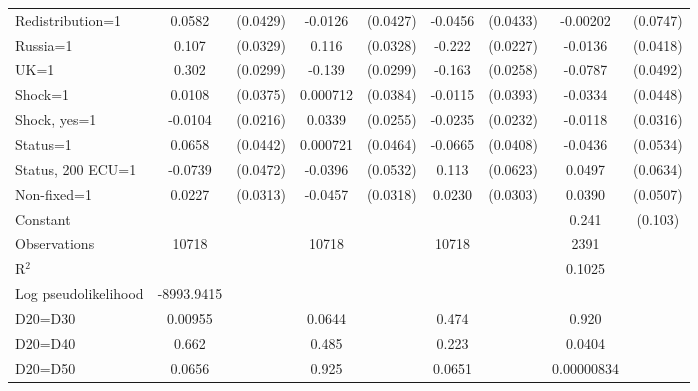 \begin{tabular}{l|cccccc|cc}
Redistribution=1&   0.0582         & (0.0429)&  -0.0126         & (0.0427)&  -0.0456         & (0.0433)& -0.00202         & (0.0747)\\
Russia=1        &    0.107\sym{***}& (0.0329)&    0.116\sym{***}& (0.0328)&   -0.222\sym{***}& (0.0227)&  -0.0136         & (0.0418)\\
UK=1            &    0.302\sym{***}& (0.0299)&   -0.139\sym{***}& (0.0299)&   -0.163\sym{***}& (0.0258)&  -0.0787         & (0.0492)\\
Shock=1         &   0.0108         & (0.0375)& 0.000712         & (0.0384)&  -0.0115         & (0.0393)&  -0.0334         & (0.0448)\\
Shock, yes=1    &  -0.0104         & (0.0216)&   0.0339         & (0.0255)&  -0.0235         & (0.0232)&  -0.0118         & (0.0316)\\
Status=1        &   0.0658         & (0.0442)& 0.000721         & (0.0464)&  -0.0665         & (0.0408)&  -0.0436         & (0.0534)\\
Status, 200 ECU=1&  -0.0739         & (0.0472)&  -0.0396         & (0.0532)&    0.113\sym{*}  & (0.0623)&   0.0497         & (0.0634)\\
Non-fixed=1     &   0.0227         & (0.0313)&  -0.0457         & (0.0318)&   0.0230         & (0.0303)&   0.0390         & (0.0507)\\
Constant        &                  &         &                  &         &                  &         &    0.241\sym{**} &  (0.103)\\
\hline
Observations    &    10718         &         &    10718         &         &    10718         &         &     2391         &         \\
R$^2$      &                  &         &                  &         &                  &         &     0.1025       &   \\ 
Log pseudolikelihood  & -8993.9415   &         &                  &         &                  &         &           &   \\ 
D20=D30         &  0.00955         &         &   0.0644         &         &    0.474         &         &    0.920         &         \\
D20=D40         &    0.662         &         &    0.485         &         &    0.223         &         &   0.0404         &         \\
D20=D50         &   0.0656         &         &    0.925         &         &   0.0651         &         &0.00000834         &         \\

\end{tabular}
